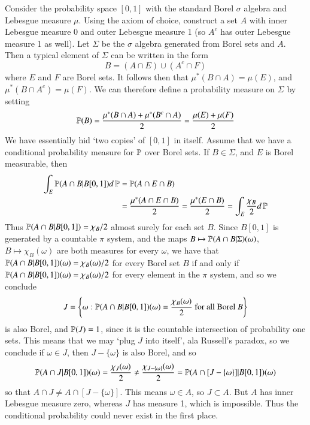 \begin{example}
    Consider the probability space $[0,1]$ with the standard Borel $\sigma$ algebra and Lebesgue measure $\mu$. Using the axiom of choice, construct a set $A$ with inner Lebesgue measure 0 and outer Lebesgue measure 1 (so $A^c$ has outer Lebesgue measure 1 as well). Let $\Sigma$ be the $\sigma$ algebra generated from Borel sets and $A$. Then a typical element of $\Sigma$ can be written in the form
    \[ B = (A \cap E) \cup (A^c \cap F) \]
    where $E$ and $F$ are Borel sets. It follows then that $\mu^*(B \cap A) = \mu(E)$, and $\mu^*(B \cap A^c) = \mu(F)$. We can therefore define a probability measure on $\Sigma$ by setting
    \[ \operatorname{\mathbb{P}}(B) = \frac{\mu^*(B \cap A) + \mu^*(B^c \cap A)}{2} = \frac{\mu(E) + \mu(F)}{2} \]
    We have essentially hid `two copies' of $[0,1]$ in itself. Assume that we have a conditional probability measure for $\operatorname{\mathbb{P}}$ over Borel sets. If $B \in \Sigma$, and $E$ is Borel measurable, then
    \begin{align*}
        \int_E \operatorname{\mathbb{P}}(A \cap B|B [0,1]) d\operatorname{\mathbb{P}} &= \operatorname{\mathbb{P}}(A \cap E \cap B)\\
        &= \frac{\mu^*(A \cap E \cap B)}{2} = \frac{\mu^*(E \cap B)}{2} = \int_E \frac{\chi_B}{2} d\operatorname{\mathbb{P}}
    \end{align*}
    Thus $\operatorname{\mathbb{P}}(A \cap B|B[0,1]) = \chi_B/2$ almost surely for each set $B$. Since $B[0,1]$ is generated by a countable $\pi$ system, and the maps $B \mapsto \operatorname{\mathbb{P}}(A \cap B|\Sigma)(\omega)$, $B \mapsto \chi_B(\omega)$ are both measures for every $\omega$, we have that $\operatorname{\mathbb{P}}(A \cap B|B[0,1])(\omega) = \chi_B(\omega)/2$ for every Borel set $B$ if and only if $\operatorname{\mathbb{P}}(A \cap B|B[0,1])(\omega) = \chi_B(\omega)/2$ for every element in the $\pi$ system, and so we conclude
    \[ J = \left\{ \omega: \PP(A \cap B|B[0,1])(\omega) = \frac{\chi_B(\omega)}{2}\ \text{for all Borel $B$} \right\} \]
    is also Borel, and $\operatorname{\mathbb{P}}(J) = 1$, since it is the countable intersection of probability one sets. This means that we may `plug $J$ into itself', ala Russell's paradox, so we conclude if $\omega \in J$, then $J - \{ \omega \}$ is also Borel, and so
    \[ \operatorname{\mathbb{P}}(A \cap J|B[0,1])(\omega) = \frac{\chi_J(\omega)}{2} \neq \frac{\chi_{J - \{ \omega \}}(\omega)}{2} = \operatorname{\mathbb{P}}(A \cap [J - \{ \omega \}]|B[0,1])(\omega) \]
    so that $A \cap J \neq A \cap [J - \{ \omega \}]$. This means $\omega \in A$, so $J \subset A$. But $A$ has inner Lebesgue measure zero, whereas $J$ has measure 1, which is impossible. Thus the conditional probability could never exist in the first place.
\end{example}

